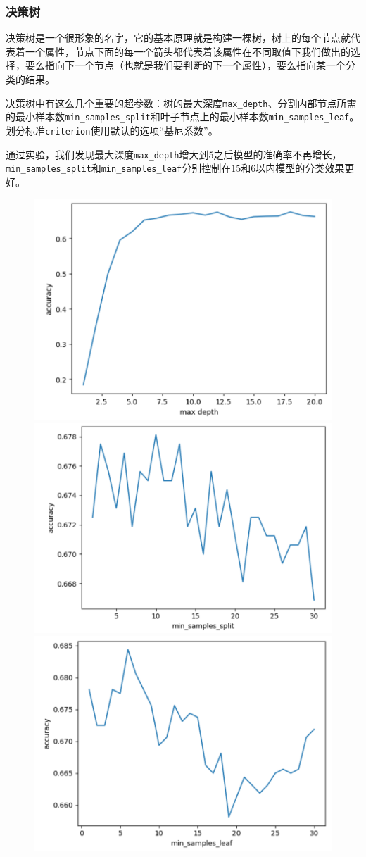\documentclass{article}
\begin{document}
\subsubsection{决策树}
决策树是一个很形象的名字，它的基本原理就是构建一棵树，树上的每个节点就代表着一个属性，节点下面的每一个箭头都代表着该属性在不同取值下我们做出的选择，要么指向下一个节点（也就是我们要判断的下一个属性），要么指向某一个分类的结果。

决策树中有这么几个重要的超参数：树的最大深度\lstinline|max_depth|、分割内部节点所需的最小样本数\lstinline|min_samples_split|和叶子节点上的最小样本数\lstinline|min_samples_leaf|。划分标准\lstinline|criterion|使用默认的选项“基尼系数”。

通过实验，我们发现最大深度\lstinline|max_depth|增大到$5$之后模型的准确率不再增长，\lstinline|min_samples_split|和\lstinline|min_samples_leaf|分别控制在$15$和$6$以内模型的分类效果更好。
\begin{figure}[h]
    \lefting
    \includegraphics[width=0.3\linewidth]{image6.png}
    \label{fig:enter-label}
    \centering
    \includegraphics[width=0.3\linewidth]{image7.png}
    \label{fig:enter-label}
    \righting
    \includegraphics[width=0.3\linewidth]{image8.png}
    \label{fig:enter-label}
\end{figure}
\end{document}
